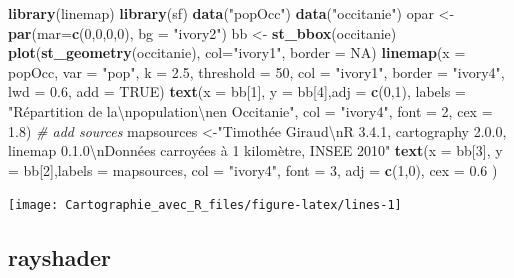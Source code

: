 \documentclass[]{book}
\newenvironment{Shaded}{\begin{snugshade}}{\end{snugshade}}
\newcommand{\KeywordTok}[1]{\textcolor[rgb]{0.13,0.29,0.53}{\textbf{#1}}}
\newcommand{\DataTypeTok}[1]{\textcolor[rgb]{0.13,0.29,0.53}{#1}}
\newcommand{\DecValTok}[1]{\textcolor[rgb]{0.00,0.00,0.81}{#1}}
\newcommand{\FloatTok}[1]{\textcolor[rgb]{0.00,0.00,0.81}{#1}}
\newcommand{\CharTok}[1]{\textcolor[rgb]{0.31,0.60,0.02}{#1}}
\newcommand{\StringTok}[1]{\textcolor[rgb]{0.31,0.60,0.02}{#1}}
\newcommand{\CommentTok}[1]{\textcolor[rgb]{0.56,0.35,0.01}{\textit{#1}}}
\newcommand{\OtherTok}[1]{\textcolor[rgb]{0.56,0.35,0.01}{#1}}
\newcommand{\NormalTok}[1]{#1}
\begin{document}
\begin{Shaded}
\begin{Highlighting}[]
\KeywordTok{library}\NormalTok{(linemap)}
\KeywordTok{library}\NormalTok{(sf)}
\KeywordTok{data}\NormalTok{(}\StringTok{"popOcc"}\NormalTok{)}
\KeywordTok{data}\NormalTok{(}\StringTok{"occitanie"}\NormalTok{)}
\NormalTok{opar <-}\StringTok{ }\KeywordTok{par}\NormalTok{(}\DataTypeTok{mar=}\KeywordTok{c}\NormalTok{(}\DecValTok{0}\NormalTok{,}\DecValTok{0}\NormalTok{,}\DecValTok{0}\NormalTok{,}\DecValTok{0}\NormalTok{), }\DataTypeTok{bg =} \StringTok{"ivory2"}\NormalTok{)}
\NormalTok{bb <-}\StringTok{ }\KeywordTok{st_bbox}\NormalTok{(occitanie)}
\KeywordTok{plot}\NormalTok{(}\KeywordTok{st_geometry}\NormalTok{(occitanie), }\DataTypeTok{col=}\StringTok{"ivory1"}\NormalTok{, }\DataTypeTok{border =} \OtherTok{NA}\NormalTok{)}
\KeywordTok{linemap}\NormalTok{(}\DataTypeTok{x =}\NormalTok{ popOcc, }\DataTypeTok{var =} \StringTok{"pop"}\NormalTok{, }\DataTypeTok{k =} \FloatTok{2.5}\NormalTok{, }\DataTypeTok{threshold =} \DecValTok{50}\NormalTok{,}
        \DataTypeTok{col =} \StringTok{"ivory1"}\NormalTok{, }\DataTypeTok{border =} \StringTok{"ivory4"}\NormalTok{, }\DataTypeTok{lwd =} \FloatTok{0.6}\NormalTok{, }\DataTypeTok{add =} \OtherTok{TRUE}\NormalTok{)}
\KeywordTok{text}\NormalTok{(}\DataTypeTok{x =}\NormalTok{ bb[}\DecValTok{1}\NormalTok{], }\DataTypeTok{y =}\NormalTok{ bb[}\DecValTok{4}\NormalTok{],}\DataTypeTok{adj =} \KeywordTok{c}\NormalTok{(}\DecValTok{0}\NormalTok{,}\DecValTok{1}\NormalTok{),}
     \DataTypeTok{labels =} \StringTok{"Répartition de la}\CharTok{\textbackslash{}n}\StringTok{population}\CharTok{\textbackslash{}n}\StringTok{en Occitanie"}\NormalTok{,  }
     \DataTypeTok{col =} \StringTok{"ivory4"}\NormalTok{, }\DataTypeTok{font =} \DecValTok{2}\NormalTok{,  }\DataTypeTok{cex =} \FloatTok{1.8}\NormalTok{)}
\CommentTok{# add sources}
\NormalTok{mapsources <-}\StringTok{"Timothée Giraud}\CharTok{\textbackslash{}n}\StringTok{R 3.4.1, cartography 2.0.0, linemap 0.1.0}\CharTok{\textbackslash{}n}\StringTok{Données carroyées à 1 kilomètre, INSEE 2010"}
\KeywordTok{text}\NormalTok{(}\DataTypeTok{x =}\NormalTok{ bb[}\DecValTok{3}\NormalTok{], }\DataTypeTok{y =}\NormalTok{ bb[}\DecValTok{2}\NormalTok{],}\DataTypeTok{labels =}\NormalTok{ mapsources,  }
     \DataTypeTok{col =} \StringTok{"ivory4"}\NormalTok{, }\DataTypeTok{font =} \DecValTok{3}\NormalTok{, }\DataTypeTok{adj =} \KeywordTok{c}\NormalTok{(}\DecValTok{1}\NormalTok{,}\DecValTok{0}\NormalTok{), }\DataTypeTok{cex =} \FloatTok{0.6}\NormalTok{ )}
\end{Highlighting}
\end{Shaded}

\begin{center}\texttt{[image: Cartographie\_avec\_R\_files/figure-latex/lines-1]} \end{center}

\subsection{rayshader}\label{rayshader}


\end{document}
